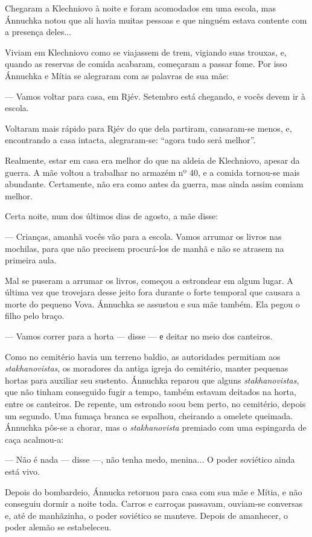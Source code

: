 Chegaram a Klechniovo à noite e foram acomodados em uma escola, mas
Ánnuchka notou que ali havia muitas pessoas e que ninguém estava
contente com a presença deles...

Viviam em Klechniovo como se viajassem de trem, vigiando suas trouxas,
e, quando as reservas de comida acabaram, começaram a passar fome. Por
isso Ánnuchka e Mítia se alegraram com as palavras de sua mãe:

--- Vamos voltar para casa, em Rjév. Setembro está chegando, e vocês
devem ir à escola.

Voltaram mais rápido para Rjév do que dela partiram, cansaram-se menos,
e, encontrando a casa intacta, alegraram-se: ``agora tudo será melhor''.

Realmente, estar em casa era melhor do que na aldeia de Klechniovo,
apesar da guerra. A mãe voltou a trabalhar no armazém nº 40, e a comida
tornou-se mais abundante. Certamente, não era como antes da guerra, mas
ainda assim comiam melhor.

Certa noite, num dos últimos dias de agosto, a mãe disse:

--- Crianças, amanhã vocês vão para a escola. Vamos arrumar os livros
nas mochilas, para que não precisem procurá-los de manhã e não se
atrasem na primeira aula.

Mal se puseram a arrumar os livros, começou a estrondear em algum lugar.
A última vez que trovejara desse jeito fora durante o forte temporal que
causara a morte do pequeno Vova. Ánnuchka se assustou e sua mãe também.
Ela pegou o filho pelo braço.

--- Vamos correr para a horta --- disse --- е deitar no meio dos
canteiros.

Como no cemitério havia um terreno baldio, as autoridades permitiam aos
\emph{stakhanovistas}, os moradores da antiga igreja do cemitério,
manter pequenas hortas para auxiliar seu sustento. Ánnuchka reparou que
alguns \emph{stakhanovistas}, que não tinham conseguido fugir a tempo,
também estavam deitados na horta, entre os canteiros. De repente, um
estrondo soou bem perto, no cemitério, depois um segundo. Uma fumaça
branca se espalhou, cheirando a omelete queimada. Ánnuchka pôs-se a
chorar, mas o \emph{stakhanovista} premiado com uma espingarda de caça
acalmou-a:

--- Não é nada --- disse ---, não tenha medo, menina... O poder
soviético ainda está vivo.

Depois do bombardeio, Ánnucka retornou para casa com sua mãe e Mítia, e
não conseguiu dormir a noite toda. Carros e carroças passavam, ouviam-se
conversas e, até de manhãzinha, o poder soviético se manteve. Depois de
amanhecer, o poder alemão se estabeleceu.

